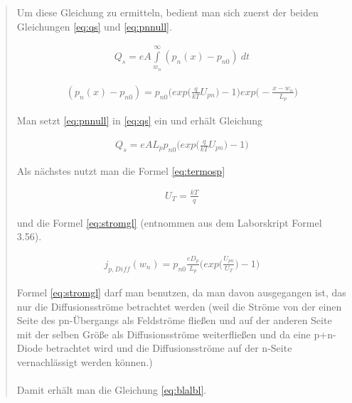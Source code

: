 \begin{quote}
	Um diese Gleichung zu ermitteln, bedient man sich zuerst der beiden 
	Gleichungen \ref{eq:qs} und \ref{eq:pnnull}. 
	
	\begin{equation}
         \begin{split}
             Q_{s}=eA\int\limits_{w_{n}}^{\infty}  (p_{n}(x)-p_{n0})  \ dt
             \end{split}
         \label{eq:qs}
    \end{equation}
	
	\begin{equation}
         \begin{split}
             (p_{n}(x)-p_{n0})=p_{n0}\Big(exp\Big(\frac{q}{kT}U_{pn}\Big)-1\Big)exp\Big(-\frac{x-w_{n}}{L_p}\Big)
             \end{split}
         \label{eq:pnnull}
    \end{equation}
	
	Man setzt \ref{eq:pnnull} in \ref{eq:qs} ein und erhält Gleichung
	
	\begin{equation}
         \begin{split}
             Q_{s}=eAL_{p}p_{n0}\Big(exp\Big(\frac{q}{kT}U_{pn}\Big)-1\Big)
             \end{split}
         \label{eq:zwischenrech}
    \end{equation}
    
    Als nächstes nutzt man die Formel \ref{eq:termosp}
    
    \begin{equation}
         \begin{split}
             U_{T}=\frac{kT}{q}
             \end{split}
         \label{eq:termosp}
    \end{equation}
	
	und die Formel \ref{eq:stromgl} (entnommen aus dem Laborskript Formel 3.56).
	
	\begin{equation}
         \begin{split}
             j_{p,Diff}(w_{n})=p_{n0}\frac{eD_{p}}{L_p}\Big(exp\Big(\frac{U_{pn}}{U_T}\Big)-1\Big)
             \end{split}
         \label{eq:stromgl}
    \end{equation}
	
	Formel \ref{eq:stromgl} darf man benutzen, da man davon ausgegangen ist, das
	nur die Diffusionsströme betrachtet werden (weil die Ströme von der einen 
	Seite des pn-Übergangs als Feldströme fließen und auf der anderen Seite mit
	der selben Größe als Diffusionsströme weiterfließen und da eine p+n-Diode 
	betrachtet wird und die Diffusionsströme auf der n-Seite vernachlässigt 
	werden können.)\\
	\\
	Damit erhält man die Gleichung \ref{eq:blalbl}.
	

\end{quote}
